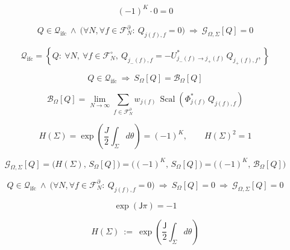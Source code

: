 \documentclass[12pt]{article}
\begin{document}
\begin{equation}
(-1)^K\cdot 0=0
\end{equation}

\begin{equation}
Q\in\mathcal{Q}_{\mathrm{ifc}}\ \wedge\ \Big(\forall N,\forall f\in\mathcal{F}_N^\partial:\ Q_{j(f),f}=0\Big)\ \Longrightarrow\ \mathcal{G}_{\Omega,\Sigma}[Q]=0
\end{equation}

\begin{equation}
\boxed{
\mathcal{Q}_{\mathrm{ifc}}
=\left\{Q:\ \forall N,\ \forall f\in\mathcal{F}_N^\circ,\ Q_{j_-(f),f}=-U_{j_-(f)\to j_+(f)}^*\,Q_{j_+(f),f},\right\}
}
\end{equation}

\begin{equation}
\boxed{
Q\in\mathcal{Q}_{\mathrm{ifc}}\ \Longrightarrow\ S_\Omega[Q]=\mathcal{B}_\Omega[Q]
}
\end{equation}

\begin{equation}
\boxed{
\mathcal{B}_\Omega[Q]=\lim_{N\to\infty}\sum_{f\in\mathcal{F}_N^\partial} w_{j(f)}\,\operatorname{Scal}\!\left(\Phi_{j(f)}^*\,Q_{j(f),f}\right)
}
\end{equation}

\begin{equation}
\boxed{
H(\Sigma)=\exp\!\left(\frac{J}{2}\int_\Sigma d\theta\right)=(-1)^K,\qquad H(\Sigma)^2=1
}
\end{equation}

\begin{equation}
\boxed{
\mathcal{G}_{\Omega,\Sigma}[Q]=\bigl(H(\Sigma),\,S_\Omega[Q]\bigr)=\bigl((-1)^K,\,S_\Omega[Q]\bigr)=\bigl((-1)^K,\,\mathcal{B}_\Omega[Q]\bigr)
}
\end{equation}

\begin{equation}
\boxed{
Q\in\mathcal{Q}_{\mathrm{ifc}}\ \wedge\ \Big(\forall N,\forall f\in\mathcal{F}_N^\partial:\ Q_{j(f),f}=0\Big)\ \Longrightarrow\ S_\Omega[Q]=0\ \Longrightarrow\ \mathcal{G}_{\Omega,\Sigma}[Q]=0
}
\end{equation}

\begin{equation}
\exp(\mathsf{J}\pi)=-1
\end{equation}

\begin{equation}
H(\Sigma)\ :=\ \exp\!\left(\frac{\mathsf{J}}{2}\int_\Sigma d\theta\right)
\end{equation}
\end{document}
